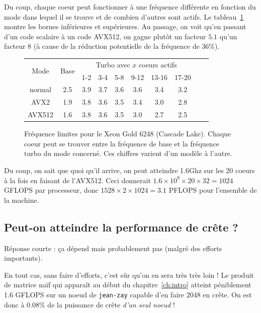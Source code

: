 Du coup, chaque coeur peut fonctionner à une fréquence différente en fonction du
mode dans lequel il se trouve et de combien d'autres sont actifs. Le
tableau~\ref{tab:freq-scaling-xeon} montre les bornes inférieures et
supérieures. Au passage, on voit qu'en passant d'un code scalaire à un code
AVX512, on gagne plutôt un facteur $5.1$ qu'un facteur 8 (à cause de la
réduction potentielle de la fréquence de 36\%).

\begin{figure}
  \centering
\begin{tabular}{|c|c||c|c|c|c|c|c|c|c|}
  \hline
  \multirow{2}{*}{Mode}   & \multirow{2}{*}{Base} & \multicolumn{6}{c|}{Turbo avec $x$ coeurs actifs} \\
  & &             1-2 & 3-4 & 5-8 & 9-12 & 13-16 & 17-20 \\
  \hline\hline
  normal & 2.5	& 3.9 & 3.7 & 3.6 & 3.6 & 3.4 & 3.2 \\
  \hline
  AVX2	 & 1.9	& 3.8 & 3.6 & 3.5 & 3.4 & 3.0 & 2.8 \\
  \hline
  AVX512 & 1.6	& 3.8 & 3.6 & 3.5 & 3.0 & 2.7 & 2.5 \\
  \hline
\end{tabular}
\caption{Fréquence limites pour le Xeon Gold 6248 (Cascade Lake). Chaque coeur
  peut se trouver entre la fréquence de base et la fréquence turbo du mode
  concerné. Ces chiffres varient d'un modèle à
  l'autre. \label{tab:freq-scaling-xeon}}
\end{figure}

Du coup, on sait que quoi qu'il arrive, on peut atteindre 1.6Ghz sur les 20
coeurs à la fois en faisant de l'AVX512. Ceci donnerait
$1.6 \times 10^9 \times 20 \times 32 = 1024$ GFLOPS par processeur, donc
$1528 \times 2 \times 1024 = 3.1$ PFLOPS pour l'ensemble de la machine.

\subsection{Peut-on atteindre la performance de crête ?}

Réponse courte : ça dépend mais probablement pas (malgré des efforts importants). 

En tout cas, sans faire d'efforts, c'est sûr qu'on en sera très très loin ! Le
produit de matrice naïf qui apparaît au début du chapitre~\ref{ch:intro}
atteint péniblement 1.6 GFLOPS sur un noeud de \texttt{jean-zay} capable d'en
faire 2048 \og en crête\fg. On est donc à $0.08\%$ de la puissance de crête
\emph{d'un seul noeud} !

